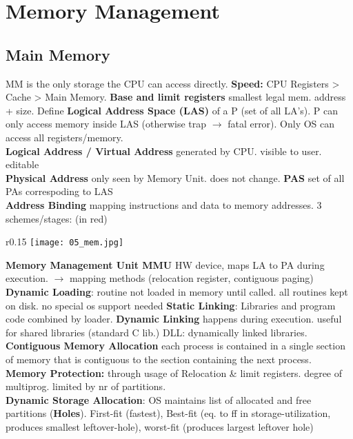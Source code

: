 \section*{Memory Management}
\subsection*{Main Memory}
MM is the only storage the CPU can access directly. \textbf{Speed:} CPU Registers > Cache > Main Memory.
    \textbf{Base and limit registers} smallest legal mem. address + size. Define \textbf{Logical Address Space (LAS)} of a P (set of all LA's). P can only access memory inside LAS (otherwise trap $\rightarrow$ fatal error). Only OS can access all registers/memory. \\
    \textbf{Logical Address / Virtual Address} generated by CPU. visible to user. editable \\
    \textbf{Physical Address} only seen by Memory Unit. does not change. \textbf{PAS} set of  all PAs correspoding to LAS \\
    \textbf{Address Binding} mapping instructions and data to memory addresses. 3 schemes/stages: (in red) \\
    \begin{wrapfigure}{r}{0.15\linewidth}
        \vspace{-12pt}
        \texttt{[image: 05\_mem.jpg]}
        \vspace{-60pt}
    \end{wrapfigure}
    \textbf{Memory Management Unit MMU} HW device, maps LA to PA during execution. $\rightarrow$ mapping methods (relocation register, contiguous paging) \\
    \textbf{Dynamic Loading}: routine not loaded in memory until called. all routines kept on disk. no special os support needed \textbf{Static Linking}: Libraries and program code combined by loader. \textbf{Dynamic Linking} happens during execution. useful for shared libraries (standard C lib.) DLL: dynamically linked libraries. \\
    \textbf{Contiguous Memory Allocation} each process is contained in a single section of memory that is contiguous to the section containing the next process. \textbf{Memory Protection:} through usage of Relocation \& limit registers. degree of multiprog. limited by nr of partitions. \\
    \textbf{Dynamic Storage Allocation}: OS maintains list of allocated and free partitions (\textbf{Holes}). First-fit (fastest), Best-fit (eq. to ff in storage-utilization, produces smallest leftover-hole), worst-fit (produces largest leftover hole) \\
